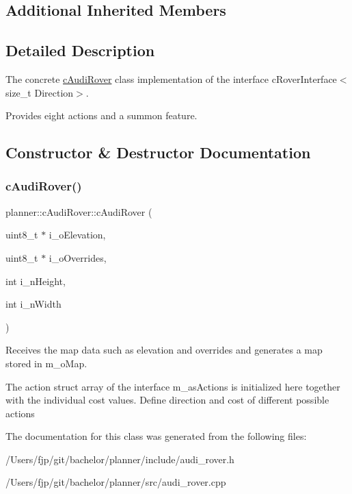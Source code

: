 \subsection*{Additional Inherited Members}


\subsection{Detailed Description}
The concrete \mbox{\hyperlink{classplanner_1_1c_audi_rover}{c\+Audi\+Rover}} class implementation of the interface c\+Rover\+Interface$<$size\+\_\+t Direction$>$. 

Provides eight actions and a summon feature. 

\subsection{Constructor \& Destructor Documentation}
\mbox{\label{classplanner_1_1c_audi_rover_abafb926aca93fb8382284a10bd341986}} 
\subsubsection{\texorpdfstring{c\+Audi\+Rover()}{cAudiRover()}}
{\footnotesize\ttfamily planner\+::c\+Audi\+Rover\+::c\+Audi\+Rover (\begin{DoxyParamCaption}\item[{uint8\+\_\+t $\ast$}]{i\+\_\+o\+Elevation,  }\item[{uint8\+\_\+t $\ast$}]{i\+\_\+o\+Overrides,  }\item[{int}]{i\+\_\+n\+Height,  }\item[{int}]{i\+\_\+n\+Width }\end{DoxyParamCaption})}



Receives the map data such as elevation and overrides and generates a map stored in m\+\_\+o\+Map. 

The action struct array of the interface m\+\_\+as\+Actions is initialized here together with the individual cost values. Define direction and cost of different possible actions 

The documentation for this class was generated from the following files\+:\begin{DoxyCompactItemize}
\item 
/\+Users/fjp/git/bachelor/planner/include/audi\+\_\+rover.\+h\item 
/\+Users/fjp/git/bachelor/planner/src/audi\+\_\+rover.\+cpp\end{DoxyCompactItemize}
